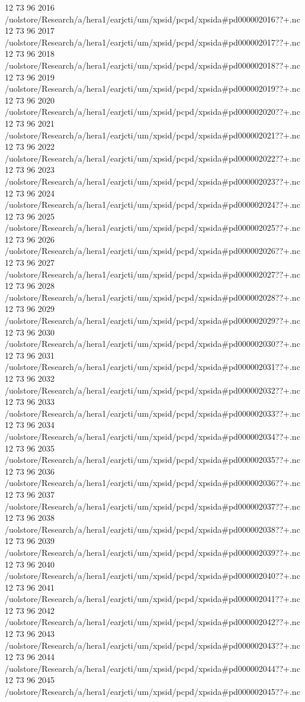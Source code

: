 12 73 96
2016
/uolstore/Research/a/hera1/earjcti/um/xpsid/pcpd/xpsida#pd000002016??+.nc
12 73 96
2017
/uolstore/Research/a/hera1/earjcti/um/xpsid/pcpd/xpsida#pd000002017??+.nc
12 73 96
2018
/uolstore/Research/a/hera1/earjcti/um/xpsid/pcpd/xpsida#pd000002018??+.nc
12 73 96
2019
/uolstore/Research/a/hera1/earjcti/um/xpsid/pcpd/xpsida#pd000002019??+.nc
12 73 96
2020
/uolstore/Research/a/hera1/earjcti/um/xpsid/pcpd/xpsida#pd000002020??+.nc
12 73 96
2021
/uolstore/Research/a/hera1/earjcti/um/xpsid/pcpd/xpsida#pd000002021??+.nc
12 73 96
2022
/uolstore/Research/a/hera1/earjcti/um/xpsid/pcpd/xpsida#pd000002022??+.nc
12 73 96
2023
/uolstore/Research/a/hera1/earjcti/um/xpsid/pcpd/xpsida#pd000002023??+.nc
12 73 96
2024
/uolstore/Research/a/hera1/earjcti/um/xpsid/pcpd/xpsida#pd000002024??+.nc
12 73 96
2025
/uolstore/Research/a/hera1/earjcti/um/xpsid/pcpd/xpsida#pd000002025??+.nc
12 73 96
2026
/uolstore/Research/a/hera1/earjcti/um/xpsid/pcpd/xpsida#pd000002026??+.nc
12 73 96
2027
/uolstore/Research/a/hera1/earjcti/um/xpsid/pcpd/xpsida#pd000002027??+.nc
12 73 96
2028
/uolstore/Research/a/hera1/earjcti/um/xpsid/pcpd/xpsida#pd000002028??+.nc
12 73 96
2029
/uolstore/Research/a/hera1/earjcti/um/xpsid/pcpd/xpsida#pd000002029??+.nc
12 73 96
2030
/uolstore/Research/a/hera1/earjcti/um/xpsid/pcpd/xpsida#pd000002030??+.nc
12 73 96
2031
/uolstore/Research/a/hera1/earjcti/um/xpsid/pcpd/xpsida#pd000002031??+.nc
12 73 96
2032
/uolstore/Research/a/hera1/earjcti/um/xpsid/pcpd/xpsida#pd000002032??+.nc
12 73 96
2033
/uolstore/Research/a/hera1/earjcti/um/xpsid/pcpd/xpsida#pd000002033??+.nc
12 73 96
2034
/uolstore/Research/a/hera1/earjcti/um/xpsid/pcpd/xpsida#pd000002034??+.nc
12 73 96
2035
/uolstore/Research/a/hera1/earjcti/um/xpsid/pcpd/xpsida#pd000002035??+.nc
12 73 96
2036
/uolstore/Research/a/hera1/earjcti/um/xpsid/pcpd/xpsida#pd000002036??+.nc
12 73 96
2037
/uolstore/Research/a/hera1/earjcti/um/xpsid/pcpd/xpsida#pd000002037??+.nc
12 73 96
2038
/uolstore/Research/a/hera1/earjcti/um/xpsid/pcpd/xpsida#pd000002038??+.nc
12 73 96
2039
/uolstore/Research/a/hera1/earjcti/um/xpsid/pcpd/xpsida#pd000002039??+.nc
12 73 96
2040
/uolstore/Research/a/hera1/earjcti/um/xpsid/pcpd/xpsida#pd000002040??+.nc
12 73 96
2041
/uolstore/Research/a/hera1/earjcti/um/xpsid/pcpd/xpsida#pd000002041??+.nc
12 73 96
2042
/uolstore/Research/a/hera1/earjcti/um/xpsid/pcpd/xpsida#pd000002042??+.nc
12 73 96
2043
/uolstore/Research/a/hera1/earjcti/um/xpsid/pcpd/xpsida#pd000002043??+.nc
12 73 96
2044
/uolstore/Research/a/hera1/earjcti/um/xpsid/pcpd/xpsida#pd000002044??+.nc
12 73 96
2045
/uolstore/Research/a/hera1/earjcti/um/xpsid/pcpd/xpsida#pd000002045??+.nc
